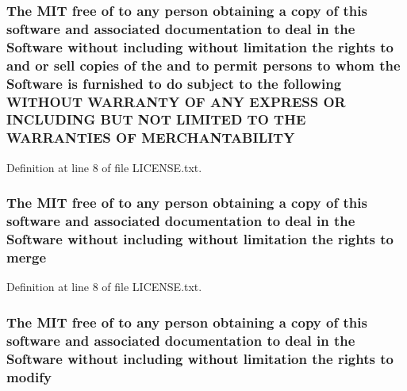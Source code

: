 \hypertarget{LICENSE_8txt_a82e4fcb28d3925b81ac5f50e2b22c270}{
\subsubsection[{M\-E\-R\-C\-H\-A\-N\-T\-A\-B\-I\-L\-I\-T\-Y}]{\setlength{\rightskip}{0pt plus 5cm}The M\-I\-T free of to any person obtaining a {\bf copy} of this software and associated documentation to deal in the {\bf Software} without including without limitation the rights to and or sell copies of the and to permit persons to whom the {\bf Software} is furnished to do subject to the following W\-I\-T\-H\-O\-U\-T W\-A\-R\-R\-A\-N\-T\-Y O\-F A\-N\-Y E\-X\-P\-R\-E\-S\-S O\-R I\-N\-C\-L\-U\-D\-I\-N\-G B\-U\-T N\-O\-T L\-I\-M\-I\-T\-E\-D T\-O T\-H\-E W\-A\-R\-R\-A\-N\-T\-I\-E\-S O\-F M\-E\-R\-C\-H\-A\-N\-T\-A\-B\-I\-L\-I\-T\-Y}}\label{LICENSE_8txt_a82e4fcb28d3925b81ac5f50e2b22c270}


Definition at line 8 of file L\-I\-C\-E\-N\-S\-E.\-txt.

\hypertarget{LICENSE_8txt_a7653d3ec339e97ccc64ec4f74e440441}{
\subsubsection[{merge}]{\setlength{\rightskip}{0pt plus 5cm}The M\-I\-T free of to any person obtaining a {\bf copy} of this software and associated documentation to deal in the {\bf Software} without including without limitation the rights to merge}}\label{LICENSE_8txt_a7653d3ec339e97ccc64ec4f74e440441}


Definition at line 8 of file L\-I\-C\-E\-N\-S\-E.\-txt.

\hypertarget{LICENSE_8txt_a4f5fee3fe655fc467fc80425521837ae}{
\subsubsection[{modify}]{\setlength{\rightskip}{0pt plus 5cm}The M\-I\-T free of to any person obtaining a {\bf copy} of this software and associated documentation to deal in the {\bf Software} without including without limitation the rights to modify}}\label{LICENSE_8txt_a4f5fee3fe655fc467fc80425521837ae}


